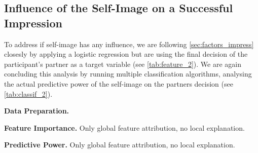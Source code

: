 \newpage
\subsection{Influence of the Self-Image on a Successful Impression}
To address if self-image has any influence, we are following \ref{sec:factors_impress} closesly by applying a logistic regression but are using the final decision of the participant's partner as a target variable (see \autoref{tab:feature_2}).  
We are again concluding this analysis by running multiple classification algorithms, analysing the actual predictive power of the self-image on the partners decision (see \autoref{tab:classif_2}).

\textbf{Data Preparation.}

\textbf{Feature Importance.}
Only global feature attribution, no local explanation. 

\textbf{Predictive Power.}
Only global feature attribution, no local explanation.

